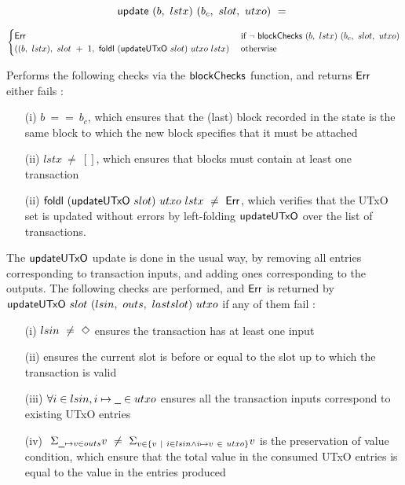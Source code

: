 \[ \mathsf{update}~(b,~lstx)~(b_c,~slot,~utxo)~=~\]

\[\begin{cases}
  \mathsf{Err} & \text{ if } \neg~\mathsf{blockChecks}~(b,~lstx)~(b_c,~slot,~utxo) \\
  ((b,~lstx),~slot~+~1,~\mathsf{foldl}~(\mathsf{updateUTxO}~slot)~utxo~lstx) & \text{ otherwise }
\end{cases} \]

Performs the following checks via the $\mathsf{blockChecks}$ function, and returns $\mathsf{Err}$
either fails :

\begin{itemize}
  \item[(i)] $b~==~b_c$, which ensures that the (last) block recorded in the state is
  the same block to which the new block specifies that it must be attached

  \item[(ii)] $lstx~\neq~[]$, which ensures that blocks must contain at least one
  transaction

  \item[(ii)] $\mathsf{foldl}~(\mathsf{updateUTxO}~slot)~utxo~lstx~\neq~\mathsf{Err}$, which verifies
  that the UTxO set is updated without errors by left-folding $\mathsf{updateUTxO}$ over
  the list of transactions.
\end{itemize}

The $\mathsf{updateUTxO}$ update is done in the usual way, by removing all entries corresponding
to transaction inputs, and adding ones corresponding to the outputs. The following
checks are performed, and $\mathsf{Err}$ is returned by $\mathsf{updateUTxO}~slot~(lsin,~outs,~lastslot)~utxo$
if any of them fail :

\begin{itemize}
  \item[(i)]  $lsin ~\neq~ \Diamond$ ensures the transaction has at least one input  \\

  \item[(ii)] ensures the current slot is before or equal to the slot up to which the
  transaction is valid

  \item[(iii)] $\forall i \in lsin, i \mapsto \wcard \in utxo$ ensures all the transaction
  inputs correspond to existing UTxO entries \\

  \item[(iv)] $~\Sigma_{\wcard \mapsto v\in outs} v~ \neq~\Sigma_{v\in \{v~\mid~i \in lsin \wedge  i\mapsto v~\in~utxo \}} v$
  is the preservation of value condition, which ensure that the total value in the consumed UTxO entries
  is equal to the value in the entries produced  \\

\end{itemize}

